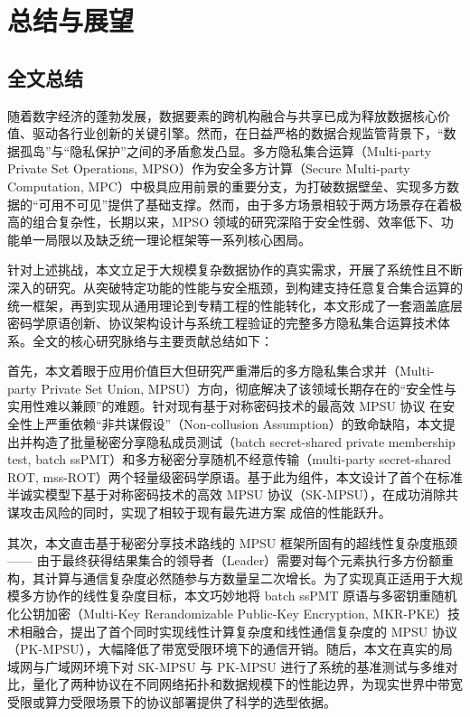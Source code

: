 \chapter{总结与展望}

\section{全文总结}

随着数字经济的蓬勃发展，数据要素的跨机构融合与共享已成为释放数据核心价值、驱动各行业创新的关键引擎。然而，在日益严格的数据合规监管背景下，“数据孤岛”与“隐私保护”之间的矛盾愈发凸显。多方隐私集合运算（Multi-party Private Set Operations, MPSO）作为安全多方计算（Secure Multi-party Computation, MPC）中极具应用前景的重要分支，为打破数据壁垒、实现多方数据的“可用不可见”提供了基础支撑。然而，由于多方场景相较于两方场景存在着极高的组合复杂性，长期以来，MPSO 领域的研究深陷于安全性弱、效率低下、功能单一局限以及缺乏统一理论框架等一系列核心困局。

针对上述挑战，本文立足于大规模复杂数据协作的真实需求，开展了系统性且不断深入的研究。从突破特定功能的性能与安全瓶颈，到构建支持任意复合集合运算的统一框架，再到实现从通用理论到专精工程的性能转化，本文形成了一套涵盖底层密码学原语创新、协议架构设计与系统工程验证的完整多方隐私集合运算技术体系。全文的核心研究脉络与主要贡献总结如下：

首先，本文着眼于应用价值巨大但研究严重滞后的多方隐私集合求并（Multi-party Private Set Union, MPSU）方向，彻底解决了该领域长期存在的“安全性与实用性难以兼顾”的难题。针对现有基于对称密码技术的最高效 MPSU 协议 \cite{LG-ASIACRYPT-2023} 在安全性上严重依赖“非共谋假设”（Non-collusion Assumption）的致命缺陷，本文提出并构造了批量秘密分享隐私成员测试（batch secret-shared private membership test, batch ssPMT）和多方秘密分享随机不经意传输（multi-party secret-shared ROT, mss-ROT）两个轻量级密码学原语。基于此为组件，本文设计了首个在标准半诚实模型下基于对称密码技术的高效 MPSU 协议（SK-MPSU），在成功消除共谋攻击风险的同时，实现了相较于现有最先进方案 \cite{LG-ASIACRYPT-2023} 成倍的性能跃升。

其次，本文直击基于秘密分享技术路线的 MPSU 框架所固有的超线性复杂度瓶颈 —— 由于最终获得结果集合的领导者（Leader）需要对每个元素执行多方份额重构，其计算与通信复杂度必然随参与方数量呈二次增长。为了实现真正适用于大规模多方协作的线性复杂度目标，本文巧妙地将 batch ssPMT 原语与多密钥重随机化公钥加密（Multi-Key Rerandomizable Public-Key Encryption, MKR-PKE）技术相融合，提出了首个同时实现线性计算复杂度和线性通信复杂度的 MPSU 协议（PK-MPSU），大幅降低了带宽受限环境下的通信开销。随后，本文在真实的局域网与广域网环境下对 SK-MPSU 与 PK-MPSU 进行了系统的基准测试与多维对比，量化了两种协议在不同网络拓扑和数据规模下的性能边界，为现实世界中带宽受限或算力受限场景下的协议部署提供了科学的选型依据。

